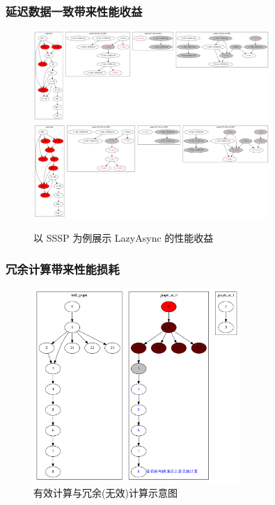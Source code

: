 \documentclass[10pt]{beamer}
\begin{document}
\begin{frame}%
  \frametitle{延迟数据一致带来性能收益}
  \begin{figure}[!htbp]
    \centering
    \includegraphics[width=0.8\textwidth]{Img/sync-iter1.png}
    \includegraphics[width=0.8\textwidth]{Img/lazy-iter1.png}
    \caption[]{以 SSSP 为例展示 LazyAsync 的性能收益 }
  \end{figure}
\end{frame}


\begin{frame}%
  \frametitle{冗余计算带来性能损耗} 
  \vspace{-1em}
  \begin{figure}[!htbp]
    \centering
    \includegraphics[width=0.7\textwidth]{Img/useless.png}
    \caption[]{有效计算与冗余(无效)计算示意图}
  \end{figure}
\end{frame}
\end{document}
